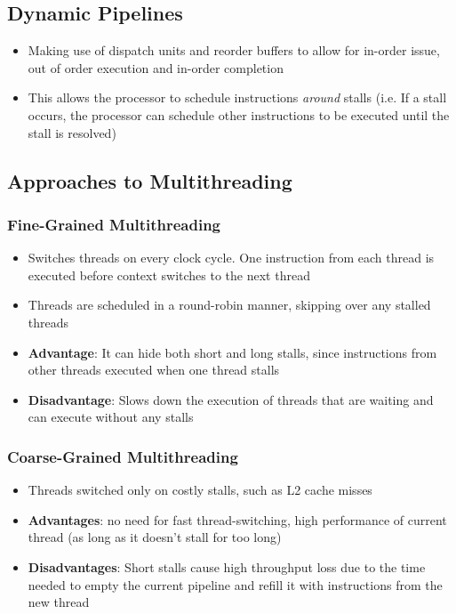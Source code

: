 \documentclass{article}
\begin{document}
\subsection{Dynamic Pipelines}
\begin{itemize}
    \item Making use of dispatch units and reorder buffers to allow for in-order issue, out of order execution and in-order completion
    
    \item This allows the processor to schedule instructions \textit{around} stalls (i.e. If a stall occurs, the processor can schedule other instructions to be executed until the stall is resolved)
\end{itemize}

\subsection{Approaches to Multithreading}
\subsubsection{Fine-Grained Multithreading}
\begin{itemize}
    \item Switches threads on every clock cycle. One instruction from each thread is executed before context switches to the next thread
    
    \item Threads are scheduled in a round-robin manner, skipping over any stalled threads
    
    \item \textbf{Advantage}: It can hide both short and long stalls, since instructions from other threads executed when one thread stalls 
    
    \item \textbf{Disadvantage}: Slows down the execution of threads that are waiting and can execute without any stalls
\end{itemize}

\subsubsection{Coarse-Grained Multithreading}
\begin{itemize}
    \item Threads switched only on costly stalls, such as L2 cache misses
    
    \item \textbf{Advantages}: no need for fast thread-switching, high performance of current thread (as long as it doesn't stall for too long)
    
    \item \textbf{Disadvantages}: Short stalls cause high throughput loss due to the time needed to empty the current pipeline and refill it with instructions from the new thread
\end{itemize}
\end{document}
